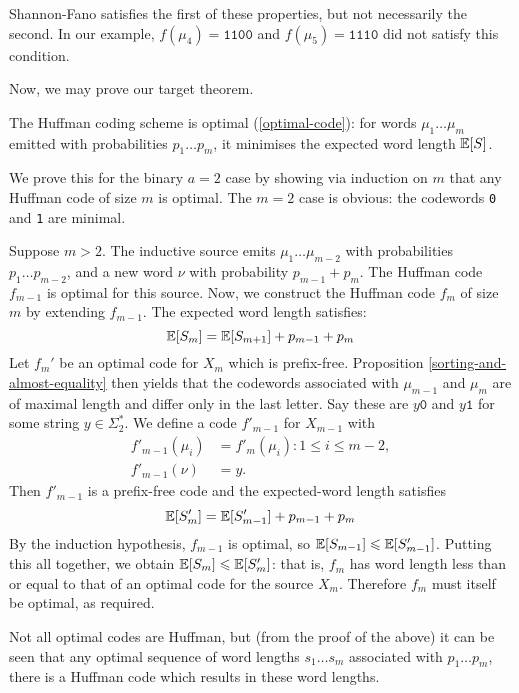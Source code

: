 \documentclass{article}
\begin{document}
\begin{note}
	Shannon-Fano satisfies the first of these properties, but not necessarily the second. In our example, $f(\mu_4) = \texttt{1100}$ and $f(\mu_5) = \texttt{1110}$ did not satisfy this condition.
\end{note}

Now, we may prove our target theorem.

\begin{theorem}
    The Huffman coding scheme is optimal (\ref{optimal-code}): for words $\mu_1 \dots \mu_m$ emitted with probabilities $p_1 \dots p_m$, it minimises the expected word length $\mathbb{E}[S]$.
\end{theorem}
\begin{prf}
	We prove this for the binary $a=2$ case by showing via induction on $m$ that any Huffman code of size $m$ is optimal. The $m=2$ case is obvious: the codewords \texttt{0} and \texttt{1} are minimal.
	
	Suppose $m > 2$. The inductive source emits $\mu_1 \dots \mu_{m-2}$ with probabilities $p_1 \dots p_{m-2}$, and a new word $\nu$ with probability $p_{m-1} + p_m$. The Huffman code $f_{m-1}$ is optimal for this source. Now, we construct the Huffman code $f_m$ of size $m$ by extending $f_{m-1}$. The expected word length satisfies:
	\[
	\mathbb{E}[S_m] = \mathbb{E}[S_{m+1}] + p_{m-1} + p_m
	\]
	Let $f_m'$ be an optimal code for $X_m$ which is prefix-free. Proposition \ref{sorting-and-almost-equality} then yields that the codewords associated with $\mu_{m-1}$ and $\mu_m$ are of maximal length and differ only in the last letter. Say these are $y\texttt{0}$ and $y\texttt{1}$ for some string $y \in \Sigma_2^*$. We define a code $f'_{m-1}$ for $X_{m-1}$ with
	\begin{align*}
    	f'_{m-1}(\mu_i) &= f'_{m}(\mu_i) : 1 \leq i \leq m-2, \\
    	f'_{m-1}(\nu) &= y.
	\end{align*}
	Then $f'_{m-1}$ is a prefix-free code and the expected-word length satisfies
	\[
	\mathbb{E}[S_{m}'] = \mathbb{E}[S'_{m-1}] + p_{m-1} + p_m
	\]
	By the induction hypothesis, $f_{m-1}$ is optimal, so $\mathbb{E}[S_{m-1}] \leqslant \mathbb{E}[S'_{m-1}]$. Putting this all together, we obtain $\mathbb{E}[S_m] \leqslant \mathbb{E}[S'_m]$: that is, $f_m$ has word length less than or equal to that of an optimal code for the source $X_m$. Therefore $f_m$ must itself be optimal, as required.
\end{prf}

\begin{note}
	Not all optimal codes are Huffman, but (from the proof of the above) it can be seen that any optimal sequence of word lengths $s_1 \dots s_m$ associated with $p_1 \dots p_m$, there is a Huffman code which results in these word lengths.
\end{note}
\end{document}

